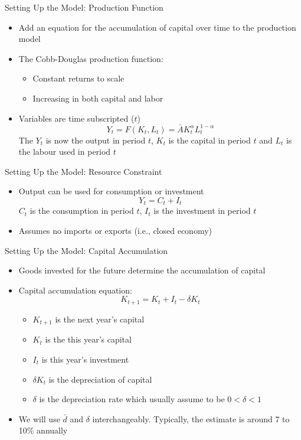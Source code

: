 \documentclass[aspectratio=1610]{beamer}
\begin{document}
\begin{frame}[wide]{Setting Up the Model: Production Function}
	\begin{itemize}
		\item Add an equation for the accumulation of capital over time to the production model
		\item The Cobb-Douglas production function:
		\begin{itemize}
			\item Constant returns to scale
			\item Increasing in both capital and labor
		\end{itemize}
		\item Variables are time subscripted ($t$)
		\[Y_t = F(K_t,L_t) = \bar{A} K_t^{\alpha} L_t^{1-\alpha}\]
		The $Y_t$ is now the output in period $t$, $K_t$ is the capital in period $t$ and $L_t$ is the labour used in period $t$
	\end{itemize}
\end{frame}

\begin{frame}[wide]{Setting Up the Model: Resource Constraint}
	\begin{itemize}
		\item Output can be used for consumption or investment
		\[Y_t = C_t + I_t\]
		$C_t$ is the consumption in period $t$, $I_t$ is the investment in period $t$
		\item Assumes no imports or exports (i.e., closed economy)
	\end{itemize}
\end{frame}

\begin{frame}[wide]{Setting Up the Model: Capital Accumulation}
	\begin{itemize}
		\item Goods invested for the future determine the accumulation of capital
		\item Capital accumulation equation:
		\[K_{t+1} = K_t + I_t - \delta K_t\]
		\begin{itemize}
			\item [] $K_{t+1}$ is the next year's capital
			\item [] $K_{t}$ is the this year's capital
			\item [] $I_t$ is this year's investment
			\item [] $\delta K_t$ is the depreciation of capital
			\item [] $\delta$ is the depreciation rate which usually assume to be $0<\delta <1$
		\end{itemize}
		\item We will use $\bar{d}$ and $\delta$ interchangeably. Typically, the estimate is around 7 to 10\% annually
	\end{itemize}
\end{frame}
\end{document}
